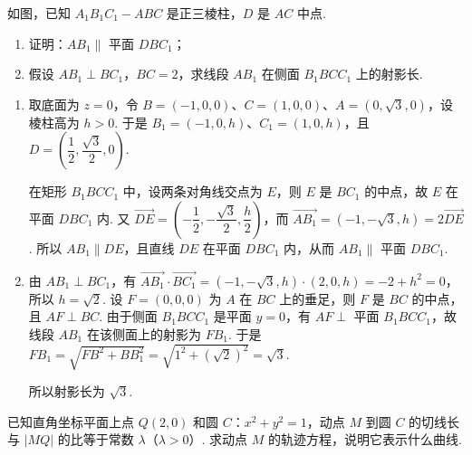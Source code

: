 \documentclass[UTF8,a4paper,oneside,11pt]{ctexbook}
\begin{document}
\begin{problem}
如图，已知 \(A_{1}B_{1}C_{1} - ABC\) 是正三棱柱，\(D\) 是 \(AC\) 中点.

\begin{enumerate}
\item 证明：\(AB_{1} \parallel\) 平面 \(DBC_{1}\)；
\item 假设 \(AB_{1} \perp BC_{1}\)，\(BC = 2\)，求线段 \(AB_{1}\) 在侧面 \(B_{1}BCC_{1}\) 上的射影长.
\end{enumerate}

\end{problem}

\begin{solution}
\begin{enumerate}
\item
取底面为 \(z=0\)，令 \(B=(-1,0,0)\)、\(C=(1,0,0)\)、\(A=(0,\sqrt3,0)\)，设棱柱高为 \(h>0\). 于是 \(B_1=(-1,0,h)\)、\(C_1=(1,0,h)\)，且 \(D=\left(\dfrac12,\dfrac{\sqrt3}{2},0\right)\).

在矩形 \(B_1BCC_1\) 中，设两条对角线交点为 \(E\)，则 \(E\) 是 \(BC_1\) 的中点，故 \(E\) 在平面 \(DBC_1\) 内. 又
\(\overrightarrow{DE}=\left(-\dfrac12,-\dfrac{\sqrt3}{2},\dfrac h2\right)\)，而 \(\overrightarrow{AB_1}=\left(-1,-\sqrt3,h\right)=2\overrightarrow{DE}\). 所以 \(AB_1\parallel DE\)，且直线 \(DE\) 在平面 \(DBC_1\) 内，从而 \(AB_1\parallel\) 平面 \(DBC_1\).

 \item
由 \(AB_1\perp BC_1\)，有 \(\overrightarrow{AB_1}\cdot\overrightarrow{BC_1}=(-1,-\sqrt3,h)\cdot(2,0,h)=-2+h^2=0\)，所以 \(h=\sqrt2\). 设 \(F=(0,0,0)\) 为 \(A\) 在 \(BC\) 上的垂足，则 \(F\) 是 \(BC\) 的中点，且 \(AF\perp BC\). 由于侧面 \(B_1BCC_1\) 是平面 \(y=0\)，有 \(AF\perp\) 平面 \(B_1BCC_1\)，故线段 \(AB_1\) 在该侧面上的射影为 \(FB_1\). 于是
\(FB_1=\sqrt{FB^2+BB_1^2}=\sqrt{1^2+(\sqrt2)^2}=\sqrt3\).

所以射影长为 \(\sqrt3\).
\end{enumerate}
\end{solution}

\begin{problem}
已知直角坐标平面上点 \(Q(2,0)\) 和圆 \(C\)：\(x^{2} + y^{2} = 1\)，动点 \(M\) 到圆 \(C\) 的切线长与 \(|MQ|\) 的比等于常数 \(\lambda\)（\(\lambda > 0\)）. 求动点 \(M\) 的轨迹方程，说明它表示什么曲线.
\end{problem}
\end{document}
